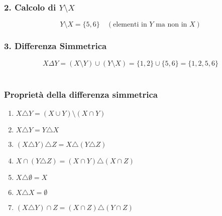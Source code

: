 \documentclass[article,12pt]{book}
\begin{document}
\begin{enumerate}
\subsubsection{2. Calcolo di \(Y \setminus X\)}
\[
Y \setminus X = \{5, 6\} \quad (\text{elementi in } Y \text{ ma non in } X)
\]

\subsubsection{3. Differenza Simmetrica}
\[
X \Delta Y = (X \setminus Y) \cup (Y \setminus X) = \{1, 2\} \cup \{5, 6\} = \{1, 2, 5, 6\}
\]
\\[4ex]
\begin{center}
\end{center}
\newpage
\subsubsection{Proprietà della differenza simmetrica}

\begin{enumerate}
    \item $X \triangle Y = (X \cup Y) \setminus (X \cap Y)$
    \item $X \triangle Y = Y \triangle X$
    \item $(X \triangle Y) \triangle Z = X \triangle (Y \triangle Z)$
    \item $X \cap (Y \triangle Z) = (X \cap Y) \triangle (X \cap Z)$
    \item $X \triangle \emptyset = X$
    \item $X \triangle X = \emptyset$
    \item $(X \triangle Y) \cap Z = (X \cap Z) \triangle (Y \cap Z)$
\end{enumerate}


\end{enumerate}
\end{document}

